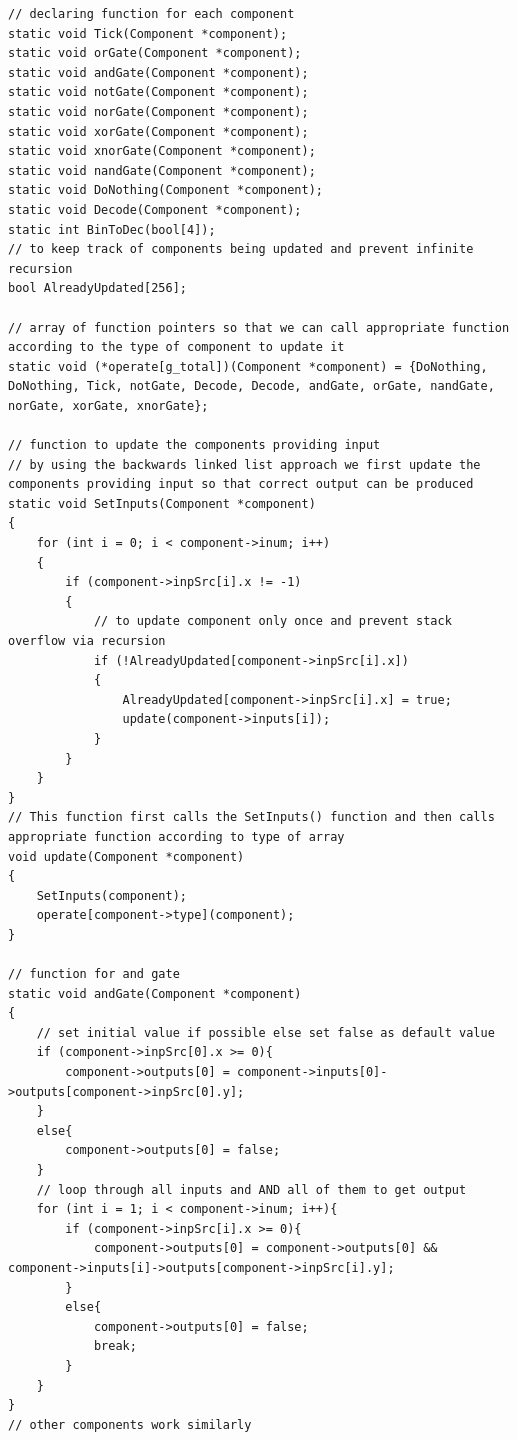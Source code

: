 \documentclass[report]{subfiles}
\begin{document}
\begin{lstlisting}
// declaring function for each component
static void Tick(Component *component);
static void orGate(Component *component);
static void andGate(Component *component);
static void notGate(Component *component);
static void norGate(Component *component);
static void xorGate(Component *component);
static void xnorGate(Component *component);
static void nandGate(Component *component);
static void DoNothing(Component *component);
static void Decode(Component *component);
static int BinToDec(bool[4]);
// to keep track of components being updated and prevent infinite recursion
bool AlreadyUpdated[256];

// array of function pointers so that we can call appropriate function according to the type of component to update it
static void (*operate[g_total])(Component *component) = {DoNothing, DoNothing, Tick, notGate, Decode, Decode, andGate, orGate, nandGate, norGate, xorGate, xnorGate};

// function to update the components providing input
// by using the backwards linked list approach we first update the components providing input so that correct output can be produced
static void SetInputs(Component *component)
{
    for (int i = 0; i < component->inum; i++)
    {
        if (component->inpSrc[i].x != -1)
        {
            // to update component only once and prevent stack overflow via recursion
            if (!AlreadyUpdated[component->inpSrc[i].x])
            {
                AlreadyUpdated[component->inpSrc[i].x] = true;
                update(component->inputs[i]);
            }
        }
    }
}
// This function first calls the SetInputs() function and then calls appropriate function according to type of array
void update(Component *component)
{
    SetInputs(component);
    operate[component->type](component);
}

// function for and gate
static void andGate(Component *component)
{
    // set initial value if possible else set false as default value
    if (component->inpSrc[0].x >= 0){
        component->outputs[0] = component->inputs[0]->outputs[component->inpSrc[0].y];
    }
    else{
        component->outputs[0] = false;
    }
    // loop through all inputs and AND all of them to get output
    for (int i = 1; i < component->inum; i++){
        if (component->inpSrc[i].x >= 0){
            component->outputs[0] = component->outputs[0] && component->inputs[i]->outputs[component->inpSrc[i].y];
        }
        else{
            component->outputs[0] = false;
            break;
        }
    }
}
// other components work similarly
\end{lstlisting}
\end{document}

